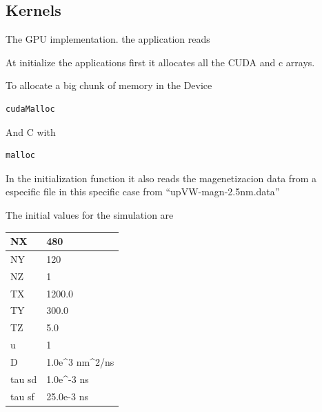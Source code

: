 \cite{numerical}




\subsection{Kernels}

The GPU implementation. the application reads

At initialize the applications first it allocates all the CUDA and c arrays.

To allocate a big chunk of memory in the Device 

\begin{lstlisting}[frame=none]
cudaMalloc
\end{lstlisting}
And C with

\begin{lstlisting}[frame=none]
malloc
\end{lstlisting}

In the initialization function it also reads the magenetizacion data from a especific file in this specific case from ``upVW-magn-2.5nm.data''


The initial values for the simulation are

\begin{table}[h]
\centering
\begin{tabular}{| l | l |}
\hline   
NX     & 480                                            \\
\hline   
NY     & 120                                            \\
\hline   
NZ     & 1                                              \\
\hline   
TX     & 1200.0                                         \\
\hline   
TY     & 300.0                                          \\
\hline   
TZ     & 5.0                                            \\
\hline   
u      & 1                                              \\
\hline   
D      & 1.0e\textasciicircum 3 nm\textasciicircum 2/ns \\
\hline   
tau sd & 1.0e\textasciicircum -3 ns                     \\
\hline   
tau sf & 25.0e-3 ns      \\
\hline   
\end{tabular}
\end{table}


